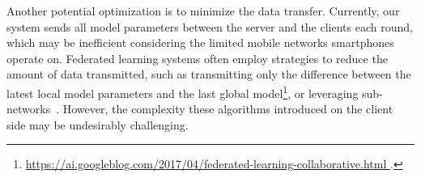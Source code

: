 Another potential optimization is to minimize the data transfer. Currently,
our system sends all model parameters between the server and the clients each
round,
which may be inefficient considering the limited mobile networks smartphones
operate on.
Federated learning systems often employ strategies to reduce the amount of data
transmitted,
such as transmitting only the difference between the latest local model
parameters and the last global model\footnote{\url{
        https://ai.googleblog.com/2017/04/federated-learning-collaborative.html
    }.}, or leveraging sub-networks~\cite{li2021hermes}.
However,
the complexity these algorithms introduced on the client side may be undesirably
challenging.
